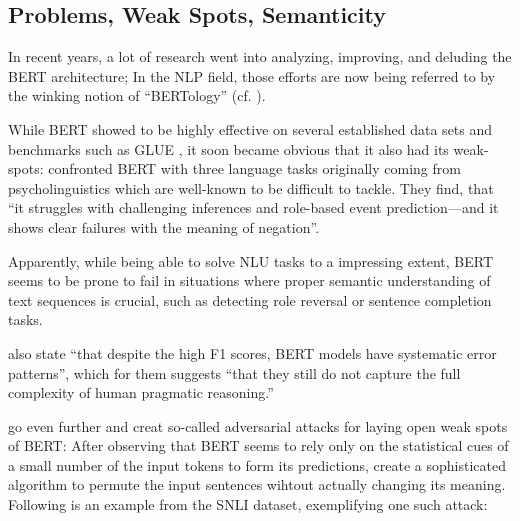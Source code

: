 




\subsection{Problems, Weak Spots, Semanticity}
\label{sec:problems}

In recent years, a lot of research went into analyzing, improving, and deluding
the BERT architecture; In the NLP field, those efforts are now being referred to by
the winking notion of ``BERTology'' (cf. \cite{rogers2020primer}).

While BERT showed to be highly effective on several established data sets and benchmarks such as
GLUE \citep{wang2018glue}, it soon became obvious that it also {\color{red} had} its weak-spots:
\citeauthor{ettinger2020bert} confronted BERT with three language tasks originally coming from
psycholinguistics which are well-known to be difficult to tackle. They find, that ``it struggles
with challenging inferences and role-based event prediction—and it shows clear failures with the
meaning of negation''.

Apparently, while being able to solve NLU tasks to a impressing extent, BERT seems to be prone
to fail in situations where proper semantic understanding of text sequences is crucial, such as
detecting role reversal or sentence completion tasks.

\cite{jiang2019evaluating} also state ``that despite the high F1 scores, BERT models have
systematic error patterns'', which for them suggests ``that they still do not capture the
full complexity of human pragmatic reasoning.''

\cite{jin2020bert} go even further and creat so-called adversarial attacks for laying open
weak spots of BERT: After observing that BERT seems to rely only on the statistical cues of a
small number of the input tokens to form its predictions, \citeauthor{jin2020bert} create a
sophisticated algorithm to permute the input sentences wihtout actually changing its meaning.
Following is an example from the SNLI \citep{bowman2015snli} dataset, exemplifying one such
attack:

